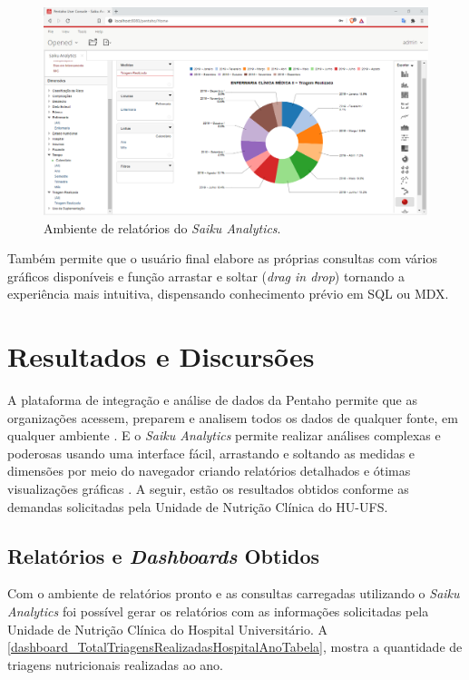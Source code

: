 \begin{figure}[htb]
	\caption{\label{fig_saikuanalytics}Ambiente de relatórios do \textit{Saiku Analytics}.}
	\begin{center}
	    \includegraphics[scale=0.45]{Imagens/figura - saikudashboard.png}
	\end{center}
\end{figure}

Também permite que o usuário final elabore as próprias consultas com vários gráficos disponíveis e função arrastar e soltar (\textit{drag in drop}) tornando a experiência mais intuitiva, dispensando conhecimento prévio em SQL ou MDX. 

\section{Resultados e Discursões}

A plataforma de integração e análise de dados da Pentaho permite que as organizações acessem, preparem e analisem todos os dados de qualquer fonte, em qualquer ambiente \cite{pentahosite}. E o \textit{Saiku Analytics} permite realizar análises complexas e poderosas usando uma interface fácil, arrastando e soltando as medidas e dimensões por meio do navegador criando relatórios detalhados e ótimas visualizações gráficas \cite{meteoribisite}. A seguir, estão  os resultados obtidos conforme as demandas solicitadas pela Unidade de Nutrição Clínica do HU-UFS.

\subsection{Relatórios e \textit{Dashboards} Obtidos}
Com o ambiente de relatórios pronto e as consultas carregadas utilizando o \textit{Saiku Analytics} foi possível gerar os relatórios com as informações solicitadas pela Unidade de Nutrição Clínica do Hospital Universitário. A \autoref{dashboard_TotalTriagensRealizadasHospitalAnoTabela}, mostra a quantidade de triagens nutricionais realizadas ao ano.

